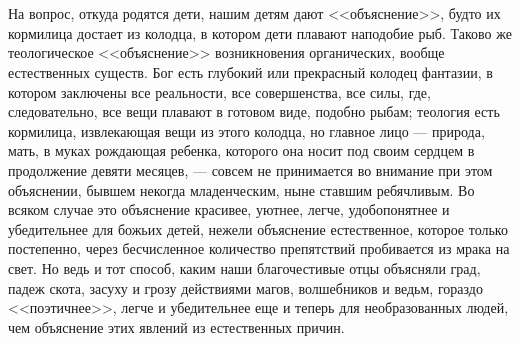 \documentclass[12pt]{article}
\begin{document}
\section{}

На вопрос, откуда родятся дети, нашим детям дают <<объяснение>>, будто их кормилица достает из колодца, в котором дети плавают наподобие рыб. Таково же теологическое <<объяснение>> возникновения органических, вообще естественных существ. Бог есть глубокий или прекрасный колодец фантазии, в котором заключены все реальности, все совершенства, все силы, где, следовательно, все вещи плавают в готовом виде, подобно рыбам; теология есть кормилица, извлекающая вещи из этого колодца, но главное лицо --- природа, мать, в муках рождающая ребенка, которого она носит под своим сердцем в продолжение девяти месяцев, --- совсем не принимается во внимание при этом объяснении, бывшем некогда младенческим, ныне ставшим ребячливым. Во всяком случае это объяснение красивее, уютнее, легче, удобопонятнее и убедительнее для божьих детей, нежели объяснение естественное, которое только постепенно, через бесчисленное количество препятствий пробивается из мрака на свет. Но ведь и тот способ, каким наши благочестивые отцы объясняли град, падеж скота, засуху и грозу действиями магов, волшебников и ведьм, гораздо <<поэтичнее>>, легче и убедительнее еще и теперь для необразованных людей, чем объяснение этих явлений из естественных причин.

\section{}
\end{document}
